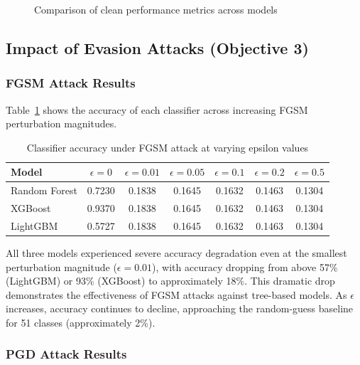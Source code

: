 \documentclass[12pt,a4paper,oneside]{report}
\begin{document}
\begin{figure}[H]
    \centering
    \caption{Comparison of clean performance metrics across models}\label{fig:clean_perf}
\end{figure}

\subsection{Impact of Evasion Attacks (Objective 3)}

\subsubsection{FGSM Attack Results}

Table~\ref{tab:fgsm_impact} shows the accuracy of each classifier across increasing FGSM perturbation magnitudes.

\begin{table}[H]
    \centering
    \caption[FGSM attack impact on accuracy]{Classifier accuracy under FGSM attack at varying epsilon values}\label{tab:fgsm_impact}
    \begin{tabular}{lcccccc}
        \toprule
        Model & $\epsilon=0$ & $\epsilon=0.01$ & $\epsilon=0.05$ & $\epsilon=0.1$ & $\epsilon=0.2$ & $\epsilon=0.5$ \\
        \midrule
        Random Forest & 0.7230 & 0.1838 & 0.1645 & 0.1632 & 0.1463 & 0.1304 \\
        XGBoost       & 0.9370 & 0.1838 & 0.1645 & 0.1632 & 0.1463 & 0.1304 \\
        LightGBM      & 0.5727 & 0.1838 & 0.1645 & 0.1632 & 0.1463 & 0.1304 \\
        \bottomrule
    \end{tabular}
\end{table}

All three models experienced severe accuracy degradation even at the smallest perturbation magnitude ($\epsilon = 0.01$), with accuracy dropping from above 57\% (LightGBM) or 93\% (XGBoost) to approximately 18\%. This dramatic drop demonstrates the effectiveness of FGSM attacks against tree-based models. As $\epsilon$ increases, accuracy continues to decline, approaching the random-guess baseline for 51 classes (approximately 2\%).

\subsubsection{PGD Attack Results}
\end{document}
